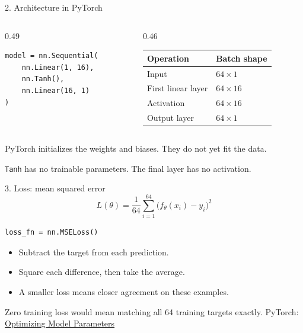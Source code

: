 \documentclass[aspectratio=169,11pt]{beamer}
\newcommand{\source}{\vfill{\tiny\color{gray}PyTorch: \href{https://docs.pytorch.org/tutorials/beginner/basics/optimization_tutorial.html}{Optimizing Model Parameters}}}
\begin{document}
\begin{frame}[fragile]{2. Architecture in PyTorch}
\begin{columns}[c]
\begin{column}{0.49\textwidth}
\begin{lstlisting}
model = nn.Sequential(
    nn.Linear(1, 16),
    nn.Tanh(),
    nn.Linear(16, 1)
)
\end{lstlisting}
\end{column}
\begin{column}{0.46\textwidth}
\begin{tabular}{ll}
\toprule
Operation & Batch shape\\\midrule
Input & $64\times 1$\\
First linear layer & $64\times16$\\
Activation & $64\times16$\\
Output layer & $64\times 1$\\\bottomrule
\end{tabular}
\end{column}
\end{columns}
\vspace{7mm}
PyTorch initializes the weights and biases. They do not yet fit the data.
\vspace{3mm}

\texttt{Tanh} has no trainable parameters. The final layer has no activation.
\end{frame}

\begin{frame}[fragile]{3. Loss: mean squared error}
\large
\[L(\theta)=\frac{1}{64}\sum_{i=1}^{64}\bigl(f_\theta(x_i)-y_i\bigr)^2\]
\normalsize
\begin{lstlisting}
loss_fn = nn.MSELoss()
\end{lstlisting}
\begin{itemize}\setlength\itemsep{3mm}
\item Subtract the target from each prediction.
\item Square each difference, then take the average.
\item A smaller loss means closer agreement on these examples.
\end{itemize}
\vspace{3mm}
Zero training loss would mean matching all 64 training targets exactly.
\source
\end{frame}
\end{document}
